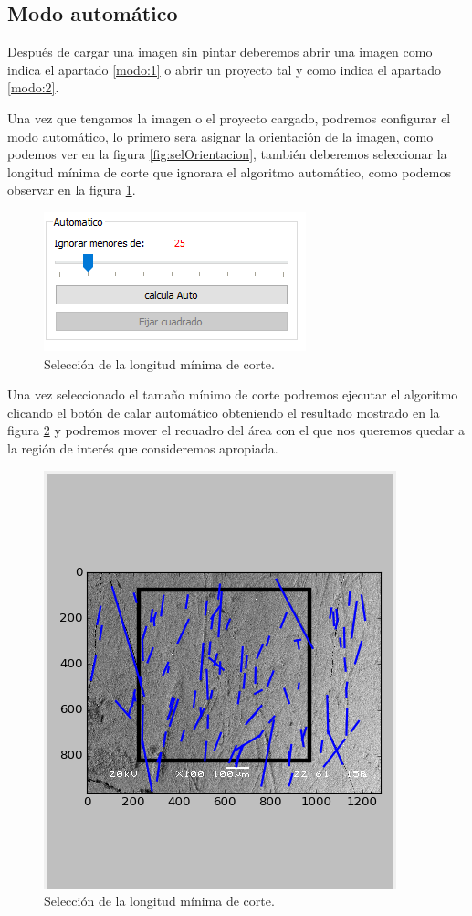\documentclass[13pt]{book}              %
\begin{document}
{\subsection{Modo automático}
Después de cargar una imagen sin pintar deberemos abrir una imagen como indica el apartado \ref{modo:1} o abrir un proyecto tal y como indica el apartado \ref{modo:2}.

Una vez que tengamos la imagen o el proyecto cargado, podremos configurar el modo automático, lo primero sera asignar la orientación de la imagen, como podemos ver en la figura \ref{fig:selOrientacion}, también deberemos seleccionar la longitud mínima de corte que ignorara el algoritmo automático, como podemos observar en la figura \ref{fig:selTam}.

\begin{figure}[h]
\centering
\includegraphics[width=.55\textwidth]{selTam}
\caption{Selección de la longitud mínima de corte.}
\label{fig:selTam}
\end{figure}

Una vez seleccionado el tamaño mínimo de corte podremos ejecutar el algoritmo clicando el botón de calar automático obteniendo el resultado mostrado en la figura \ref{fig:CalculadasAuto} y podremos mover el recuadro del área con el que nos queremos quedar a la región de interés que consideremos apropiada.

\begin{figure}[h]
\centering
\includegraphics[width=.55\textwidth]{CalculadasAuto}
\caption{Selección de la longitud mínima de corte.}
\label{fig:CalculadasAuto}
\end{figure}

}
\end{document}
